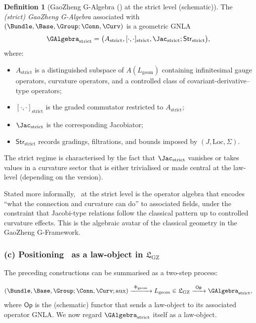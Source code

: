 \documentclass[11pt]{book}
\theoremstyle{plain}
\theoremstyle{definition}
\newtheorem{definition}[theorem]{Definition} \theoremstyle{remark}
\newcommand{\GZLS}{\ensuremath{\mathfrak{L}_{\mathrm{GZ}}}}       \newcommand{\GZLT}{\ensuremath{M_{!w}}}                           \newcommand{\GZLOC}{\ensuremath{A_M}}                             \newcommand{\GZLCurv}{\ensuremath{\mathcal{F}_{\mathrm{law}}}}
\begin{document}
\begin{definition}[GaoZheng G-Algebra (\GAlgebra) at the strict level (schematic)]
The \\ \emph{(strict) GaoZheng G-Algebra} associated with
  $(\Bundle,\Base,\Group;\Conn,\Curv)$ is a geometric GNLA
  \[
     \GAlgebra_{\mathrm{strict}}
     =
     \bigl(
       A_{\mathrm{strict}},
       [\cdot,\cdot]_{\mathrm{strict}},
       \Jac_{\mathrm{strict}};
       \mathsf{Str}_{\mathrm{strict}}
     \bigr),
  \]
  where:
  \begin{itemize}
    \item $A_{\mathrm{strict}}$ is a distinguished subspace of
          $A(L_{\mathrm{geom}})$ containing infinitesimal gauge
          operators, curvature operators, and a controlled class of
          covariant-derivative–type operators;
    \item $[\cdot,\cdot]_{\mathrm{strict}}$ is the graded commutator
          restricted to $A_{\mathrm{strict}}$;
    \item $\Jac_{\mathrm{strict}}$ is the corresponding Jacobiator;
    \item $\mathsf{Str}_{\mathrm{strict}}$ records gradings,
          filtrations, and bounds imposed by $(J,\mathrm{Loc},\Sigma)$.
  \end{itemize}
  The strict regime is characterised by the fact that
  $\Jac_{\mathrm{strict}}$ vanishes or takes values in a curvature
  sector that is either trivialised or made central at the law-level
  (depending on the version).
\end{definition}

Stated more informally, \GAlgebra\ at the strict level is the operator
algebra that encodes “what the connection and curvature can do” to
associated fields, under the constraint that Jacobi-type relations
follow the classical pattern up to controlled curvature effects. This
is the algebraic avatar of the classical geometry in the GaoZheng
G-Framework.



\subsubsection*{(c) Positioning \GAlgebra\ as a law-object in \GZLS}

The preceding constructions can be summarised as a two-step process:

\[
   (\Bundle,\Base,\Group;\Conn,\Curv;\text{aux})
   \xrightarrow{\ \Phi_{\mathrm{geom}}\ }
   L_{\mathrm{geom}}\in\GZLS
   \xrightarrow{\ \mathsf{Op}\ }
   \GAlgebra_{\mathrm{strict}},
\]
where $\mathsf{Op}$ is the (schematic) functor that sends a law-object
to its associated operator GNLA. We now regard
$\GAlgebra_{\mathrm{strict}}$ itself as a law-object.
\end{document}
